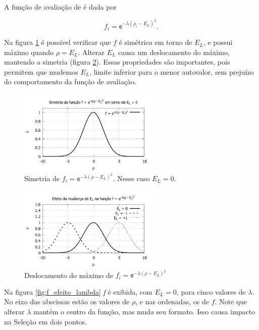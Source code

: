 	A função de avaliação de \cite{metodo2011} é dada por
	
	\begin{equation}\label{eq:f_empirica}
		f_i = \mathsf{e}^{- \lambda (\rho_i - 	E_L) ^2}.
	\end{equation}
	
	Na figura \ref{fig:f_simetrico} é possível verificar que $f$ é simétrica em torno de $E_L$, e possui máximo quando $\rho = E_L$. Alterar $E_L$ causa um deslocamento do máximo, mantendo a simetria (figura \ref{fig:f_deslocamento}). Essas propriedades são importantes, pois permitem que mudemos $E_L$, limite inferior para o menor autovalor, sem prejuízo do comportamento da função de avaliação.
	
	\begin{figure}[h]
		\centering
			\includegraphics[width=0.60\textwidth]{figs/resultados/precisaoFitness/f_simetrico.pdf}
		\caption{Simetria de $f_i = \mathsf{e}^{-\lambda(\rho - E_L)^2}$. Nesse caso $E_L = 0$.}
		\label{fig:f_simetrico}
	\end{figure}
	
	\begin{figure}[h]
		\centering
			\includegraphics[width=0.60\textwidth]{figs/resultados/precisaoFitness/f_simetrico_outros.pdf}
		\caption{Deslocamento do máximo de $f_i = \mathsf{e}^{-\lambda(\rho - E_L)^2}$}
		\label{fig:f_deslocamento}
	\end{figure}
	
	Na figura \ref{fig:f_efeito_lambda} \emph{f} é exibida, com $E_L = 0$, para cinco valores de $\lambda$. No eixo das abscissas estão os valores de $\rho$, e nas ordenadas, os de $f$. Note que alterar $\lambda$ mantém o centro da função, mas muda seu formato. Isso causa impacto na Seleção em dois pontos.
	
